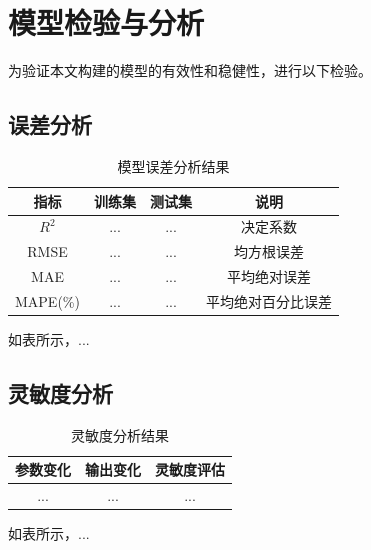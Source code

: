 \section{模型检验与分析}

为验证本文构建的模型的有效性和稳健性，进行以下检验。

\subsection{误差分析}

\begin{table}[htbp]
	\caption{模型误差分析结果}
	\centering
	\begin{tabular}{cccc}
		\toprule
		指标 & 训练集 & 测试集 & 说明 \\
		\midrule
		$R^2$ & ... & ... & 决定系数 \\
		RMSE & ... & ... & 均方根误差 \\
		MAE & ... & ... & 平均绝对误差 \\
		MAPE(\%) & ... & ... & 平均绝对百分比误差 \\
		\bottomrule
	\end{tabular}
\end{table}

如表所示，...

\subsection{灵敏度分析}

\begin{table}[htbp]
	\caption{灵敏度分析结果}
	\centering
	\begin{tabular}{ccc}
		\toprule
		参数变化 & 输出变化 & 灵敏度评估 \\
		\midrule
		... & ... & ... \\
		\bottomrule
	\end{tabular}
\end{table}

如表所示，...
